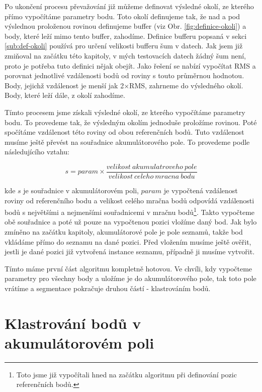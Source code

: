 \documentclass[11pt,twoside,a4paper]{book}
\begin{document}
Po ukončení procesu převažování již můžeme definovat výsledné okolí, ze kterého přímo vypočítáme parametry bodu. Toto okolí definujeme tak, že nad a pod výslednou proloženou rovinou definujeme buffer (viz Obr. \ref{fig:definice-okoli}) a body, které leží mimo tento buffer, zahodíme. Definice bufferu popsaná v sekci \ref{sub:def-okoli} používá pro určení velikosti bufferu šum v datech. Jak jsem již zmiňoval na začátku této kapitoly, v mých testovacích datech žádný šum není, proto je potřeba tuto definici nějak obejít. Jako řešení se nabízí vypočítat RMS a porovnat jednotlivé vzdálenosti bodů od roviny s touto průměrnou hodnotou. Body, jejichž vzdálenost je menší jak 2$\times$RMS, zahrneme do výsledného okolí. Body, které leží dále, z okolí zahodíme. 

Tímto procesem jsme získali výsledné okolí, ze kterého vypočítáme parametry bodu. To provedeme tak, že výsledným okolím jednoduše proložíme rovinou. Poté spočítáme vzdálenost této roviny od obou referenčních bodů. Tuto vzdálenost musíme ještě převést na souřadnice akumulátorového pole. To provedeme podle následujícího vztahu:

\begin{equation}
s = param \times \frac{velikost~akumulatroveho~pole}{velikost~celeho~mracna~bodu}
\end{equation}

\noindent
kde $s$ je souřadnice v akumulátorovém poli, $param$ je vypočtená vzdálenost roviny od referenčního bodu a velikost celého mračna bodů odpovídá vzdálenosti bodů s největšími a nejmenšími souřadnicemi v mračnu bodů\footnote{Toto jsme již vypočítali hned na začátku algoritmu při definování pozic referenčních bodů.}. Takto vypočteme obě souřadnice a poté už pouze na vypočtenou pozici vložíme daný bod. Jak bylo zmíněno na začátku kapitoly, akumulátorové pole je pole seznamů, takže bod vkládáme přímo do seznamu na dané pozici. Před vložením musíme ještě ověřit, jestli je dané pozici již vytvořená instance seznamu, případně ji musíme vytvořit.

Tímto máme první část algoritmu kompletně hotovou. Ve chvíli, kdy vypočteme parametry pro všechny body a uložíme je do akumulátorového pole, tak toto pole vrátíme a segmentace pokračuje druhou částí - klastrováním bodů.


\section{Klastrování bodů v akumulátorovém poli}
\label{sub:seg1-klastrovani}
\end{document}
